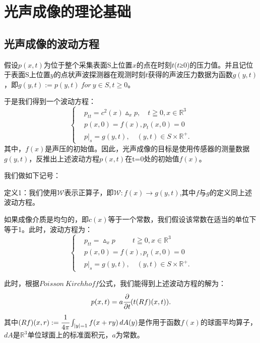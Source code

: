 \chapter{光声成像的理论基础}

\label{cha:sysu-thesis-contents-format-requirement}

\section{光声成像的波动方程}
假设$p(x,t)$为位于整个采集表面S上位置$x$的点在时刻$t$($t$≥0)的压力值。并且记位于表面S上位置$y$的点状声波探测器在观测时刻$t$获得的声波压力数据为函数$g(y,t)$，即$g(y,t):=p(y,t) \ for \ y\in S,t\geqslant0$。

于是我们得到一个波动方程：
\begin{equation} \label{201}
	\left\{
	\begin{aligned}
		& p_{tt}=c^2(x)\vartriangle _xp,\quad t\geqq0,x\in\mathbb{R}^3\\
		& p(x,0)=f(x),p_t(x,0)=0 \\
		& p|_s = g(y,t),\quad (y,t)\in S\times\mathbb{R}^+.
	\end{aligned}
	\right.
\end{equation}
其中，$f(x)$是声压的初始值。因此，光声成像的目标是使用传感器的测量数据$g(y,t)$，反推出上述波动方程$p(x,t)$在t=0处的初始值$f(x)$。

我们做如下记号：

定义1：我们使用$\mathcal{W}$表示正算子，即$\mathcal{W}:f(x)\to g(y,t)$,其中$f$与$g$的定义同上述波动方程。

如果成像介质是均匀的，即$c(x)$等于一个常数，我们假设该常数在适当的单位下等于1。此时，波动方程为：
\begin{equation} \label{202}
	\left\{
	\begin{aligned}
		& p_{tt}=\vartriangle _xp \quad \quad \ \ t\geqq0,x\in\mathbb{R}^3\\
		& p(x,0)=f(x),p_t(x,0)=0\\
		& p|_s = g(y,t),\quad (y,t)\in S\times\mathbb{R}^+.
	\end{aligned}
	\right.
\end{equation}


此时，根据$Poisson\ Kirchhoff$公式，我们能得到上述波动方程的解为：
\begin{equation} \label{203}
\begin{aligned}
p(x,t)=a\cfrac{\partial}{\partial t}(t(Rf)(x,t)).
\end{aligned}
\end{equation}
其中$(Rf)(x,r):=\cfrac{1}{4\pi}\int_{|y|=1} f(x+ry)\, dA(y)$是作用于函数$f(x)$的球面平均算子，$dA$是$\mathbb{R}^3$单位球面上的标准面积元，$a$为常数。

